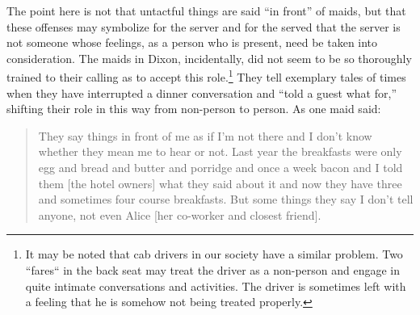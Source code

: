 \documentclass[openany,nobib]{tufte-book}
\begin{document}
\noindent The point here is not that untactful things are said ``in front'' of
maids, but that these offenses may symbolize for the server and for the
served that the server is not someone whose feelings, as a person who is
present, need be taken into consideration. The maids in Dixon,
incidentally, did not seem to be so thoroughly trained to their calling
as to accept this role.\footnote{It may be noted that cab drivers in our
  society have a similar problem. Two ``fares`` in the back seat may
  treat the driver as a non-person and engage in quite intimate
  conversations and activities. The driver is sometimes left with a
  feeling that he is somehow not being treated properly.} They tell
exemplary tales of times when they have interrupted a dinner
conversation and ``told a guest what for,'' shifting their role in this
way from non-person to person. As one maid said:

\begin{quote}
They say things in front of me as if I'm not there and I don't know
whether they mean me to hear or not. Last year the breakfasts were only
egg and bread and butter and porridge and once a week bacon and I told
them {[}the hotel owners{]} what they said about it and now they have
three and sometimes four course breakfasts. But some things they say I
don't tell anyone, not even Alice {[}her co-worker and closest
friend{]}.
\end{quote}
\end{document}
